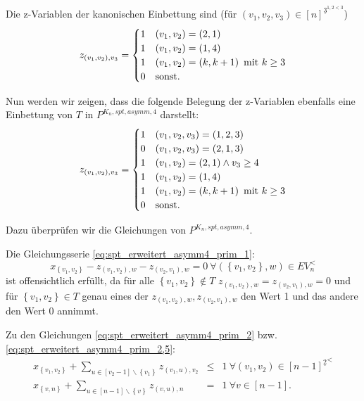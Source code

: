 \documentclass[10p,a4paper,BCOR = 12mm, DIV=15]{scrbook}
\begin{document}
{\begin{bew}
Die z-Variablen der kanonischen Einbettung sind (für $\left(v_1, v_2, v_3\right) \in \left[n\right]^{\underline{3}^{1, 2 < 3}}$)
\begin{displaymath}
z_{\left(v_1, v_2\right), v_3} = \begin{cases}
1 & \left(v_1, v_2\right) = \left(2, 1\right) \\
1 & \left(v_1, v_2\right) = \left(1, 4\right) \\
1 & \left(v_1, v_2\right) = \left(k, k+1\right)\textnormal{ mit }k \geq 3 \\
0 & \textnormal{sonst}.
\end{cases}
\end{displaymath}

Nun werden wir zeigen, dass die folgende Belegung der z-Variablen ebenfalls eine Einbettung von $T$ in $P^{K_n, spt, asymm, 4}$ darstellt:
\begin{displaymath}
z_{\left(v_1, v_2\right), v_3} = \begin{cases}
1 & \left(v_1, v_2, v_3\right) = \left(1, 2, 3\right) \\
0 & \left(v_1, v_2, v_3\right) = \left(2, 1, 3\right) \\
1 & \left(v_1, v_2\right) = \left(2, 1\right) \wedge v_3 \geq 4 \\
1 & \left(v_1, v_2\right) = \left(1, 4\right) \\
1 & \left(v_1, v_2\right) = \left(k, k+1\right)\textnormal{ mit }k \geq 3 \\
0 & \textnormal{sonst}.
\end{cases}
\end{displaymath}

Dazu überprüfen wir die Gleichungen von $P^{K_n, spt, asymm, 4}$.

Die Gleichungsserie \eqref{eq:spt_erweitert_asymm4_prim_1}:
\begin{displaymath}
x_{\left\{v_1, v_2\right\}} - z_{\left(v_1, v_2\right), w} - z_{\left(v_2, v_1\right), w} = 0\ \forall \left(\left\{v_1, v_2\right\}, w\right)\in EV_n^< 
\end{displaymath}
ist offensichtlich erfüllt, da für alle $\left\{v_1, v_2\right\} \notin T$ $z_{\left(v_1, v_2\right), w} = z_{\left(v_2, v_1\right), w} = 0$ und für $\left\{v_1, v_2\right\} \in T$ genau eines der $z_{\left(v_1, v_2\right), w}, z_{\left(v_2, v_1\right), w}$ den Wert 1 und das andere den Wert 0 annimmt.

Zu den Gleichungen \eqref{eq:spt_erweitert_asymm4_prim_2} bzw. \eqref{eq:spt_erweitert_asymm4_prim_2,5}:
\begin{eqnarray*}
x_{\left\{v_1, v_2\right\}} + \sum_{u\in[v_2-1]\backslash\left\{v_1\right\}} z_{\left(v_1, u\right), v_2} & \leq & 1\ \forall \left(v_1, v_2\right)\in {[n-1]^{\underline{2}}}^< \\
x_{\left\{v, n\right\}} + \sum_{u\in[n-1]\backslash\left\{v\right\}} z_{\left(v, u\right), n} & = & 1\ \forall v \in [n-1].
\end{eqnarray*}


\end{bew}}
\end{document}
